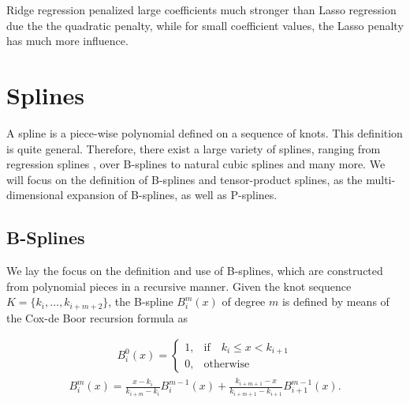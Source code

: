 \documentclass[10pt,a4paper]{report}
\begin{document}
Ridge regression penalized large coefficients much stronger than Lasso regression due the the quadratic penalty, while for small coefficient values, the Lasso penalty has much more influence. \cite{tibshirani1996lasso}

\section{Splines} \label{sec:Splines}
	
A spline is a piece-wise polynomial defined on a sequence of knots. This definition is quite general. Therefore, there exist a large variety of splines, ranging from regression splines \cite{eubank1990regressionsplines}, over B-splines \cite{deBoor1978practicalGuideToSplines} to natural cubic splines and many more. We will focus on the definition of B-splines and tensor-product splines, as the multi-dimensional expansion of B-splines, as well as P-splines. \cite{deBoor1978practicalGuideToSplines} \cite{eilers1996flexible}
\subsection{B-Splines} \label{subsec:b-splines}

We lay the focus on the definition and use of B-splines, which are constructed from polynomial pieces in a recursive manner. Given the knot sequence $K = \{k_i, \dots, k_{i+m+2}\}$,  the B-spline $B_i^m(x)$ of degree $m$ is defined by means of the Cox-de Boor recursion formula as

\begin{align} \label{eq:Bspline_recDef1}
	B_i^0(x) = \begin{cases} 1, & \text{if} \quad k_i \le x < k_{i+1} \\ 
					 		 0, & \text{otherwise} 
	\end{cases}
\end{align}
\begin{align} \label{eq:Bspline_recDef2}
	B_i^m(x) = \frac{x - k_i}{k_{i+m} - k_i} B_i^{m-1}(x) + \frac{k_{i+m+1} - x}{k_{i+m+1} - k_{i+1}} B_{i+1}^{m-1}(x).
\end{align}
\end{document}
